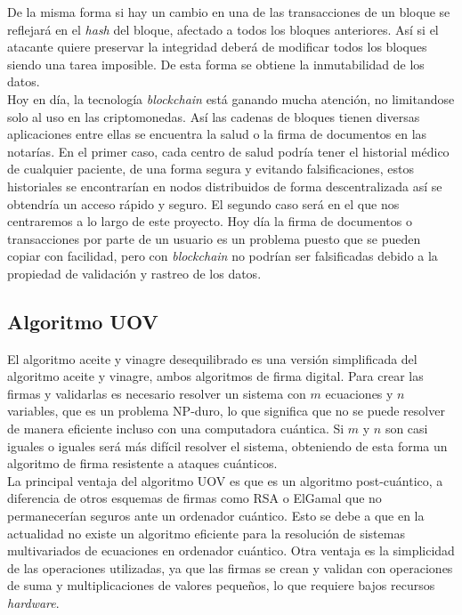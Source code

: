 De la misma forma si hay un cambio en una de las transacciones de un bloque se reflejará en el \textit{hash} del bloque, afectado a todos los bloques anteriores. Así si el atacante quiere preservar la integridad deberá de modificar todos los bloques siendo una tarea imposible. De esta forma se obtiene la inmutabilidad de los datos.\\

Hoy en día, la tecnología \textit{blockchain} está ganando mucha atención, no limitandose solo al uso en las criptomonedas. Así las cadenas de bloques tienen diversas aplicaciones entre ellas se encuentra la salud o la firma de documentos en las notarías. En el primer caso, cada centro  de salud podría tener el historial médico de cualquier paciente, de una forma segura y evitando falsificaciones, estos historiales se encontrarían en nodos distribuidos de forma descentralizada así se obtendría un acceso rápido y seguro. El segundo caso será en el que nos centraremos a lo largo de este proyecto. Hoy día la firma de documentos o transacciones por parte de un usuario es un problema puesto que se pueden copiar con facilidad, pero con \textit{blockchain} no podrían ser falsificadas debido a la propiedad de validación y rastreo de los datos.\\


\subsection{Algoritmo UOV}\label{sec:intro:UOV}

El algoritmo aceite y vinagre desequilibrado es una versión simplificada del algoritmo aceite y vinagre, ambos algoritmos de firma digital. Para crear las firmas y validarlas es necesario resolver un sistema con $m$ ecuaciones y $n$ variables, que es un problema NP-duro, lo que significa que no se puede resolver de manera eficiente incluso con una computadora cuántica. Si $m$ y $n$ son casi iguales o iguales será más difícil resolver el sistema, obteniendo de esta forma un algoritmo de firma resistente a ataques cuánticos.\\

La principal ventaja del algoritmo UOV es que es un algoritmo post-cuántico, a diferencia de otros esquemas de firmas como RSA o ElGamal que no permanecerían seguros ante un ordenador cuántico. Esto se debe a que en la actualidad no existe un algoritmo eficiente para la resolución de sistemas multivariados de ecuaciones  en ordenador cuántico. Otra ventaja es la simplicidad de las operaciones utilizadas, ya que las firmas se crean y validan con operaciones de suma y multiplicaciones de valores pequeños, lo que requiere bajos recursos \textit{hardware}. 


